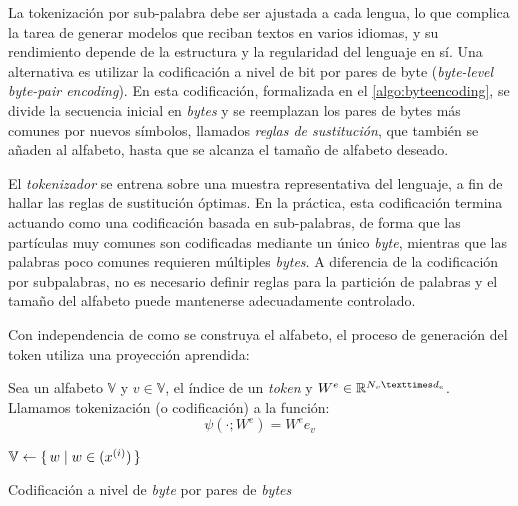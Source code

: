 La tokenización por sub-palabra debe ser ajustada a cada lengua, lo que complica la tarea de generar modelos que reciban textos en varios idiomas, y su rendimiento depende de la estructura y la regularidad del lenguaje en sí. Una alternativa es utilizar la codificación a nivel de bit por pares de byte (\textit{byte-level byte-pair encoding}). En esta codificación, formalizada en el \cref{algo:byteencoding}, se divide la secuencia inicial en \textit{bytes} y se reemplazan los pares de bytes más comunes por nuevos símbolos, llamados \textit{reglas de sustitución}, que también se añaden al alfabeto, hasta que se alcanza el tamaño de alfabeto deseado.

El \textit{tokenizador} se entrena sobre una muestra representativa del lenguaje, a fin de hallar las reglas de sustitución óptimas. En la práctica, esta codificación termina actuando como una codificación basada en sub-palabras, de forma que las partículas muy comunes son codificadas mediante un único \textit{byte}, mientras que las palabras poco comunes requieren múltiples \textit{bytes}. A diferencia de la codificación por subpalabras, no es necesario definir reglas para la partición de palabras y el tamaño del alfabeto puede mantenerse adecuadamente controlado.

Con independencia de como se construya el alfabeto, el proceso de generación del token utiliza una proyección aprendida:

\begin{definition}
    Sea un alfabeto \( \mathbb{V} \) y \( v \in \mathbb{V} \), el índice de un \textit{token} y \( W^e \in \real{N_v × d_e }\). Llamamos tokenización (o codificación) a la función:
    \[
        \psi(\cdot; W^e) = W^e e_{v}
    \]
\end{definition}

\begin{algorithm}[tb]
    \SetAlgoLined
    
    $\mathbb{V} \gets \{\,w \mid w \in (x^{(i)})\,\}$\; 
    \caption{Codificación a nivel de \textit{byte} por pares de \textit{bytes}}
    \label{algo:byteencoding}
\end{algorithm}



